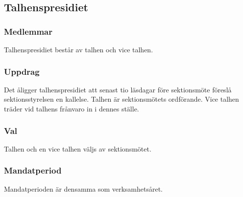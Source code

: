 \subsection{Talhenspresidiet}
\subsubsection{Medlemmar}
Talhenspresidiet består av talhen och vice talhen.
\subsubsection{Uppdrag}
Det åligger talhenspresidiet att senast tio läsdagar före sektionsmöte föreslå sektionsstyrelsen en kallelse. Talhen är sektionsmötets ordförande. Vice talhen träder vid talhens frånvaro in i dennes ställe.
\subsubsection{Val}
Talhen och en vice talhen väljs av sektionsmötet.
\subsubsection{Mandatperiod}
Mandatperioden är densamma som verksamhetsåret.

\newpage
